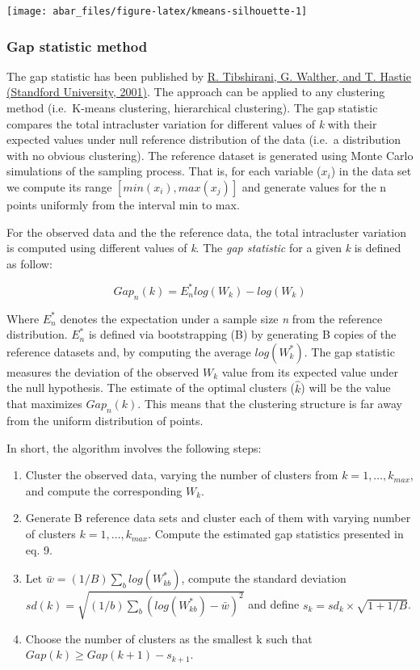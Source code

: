 \documentclass[]{book}
\providecommand{\tightlist}{%
  \setlength{\itemsep}{0pt}\setlength{\parskip}{0pt}}
\theoremstyle{definition}
\theoremstyle{definition}
\theoremstyle{definition}
\theoremstyle{remark}
\begin{document}
\begin{center}\texttt{[image: abar\_files/figure-latex/kmeans-silhouette-1]} \end{center}

\hypertarget{gap}{%
\subsubsection{Gap statistic method}\label{gap}}

The gap statistic has been published by
\href{http://web.stanford.edu/~hastie/Papers/gap.pdf}{R. Tibshirani, G.
Walther, and T. Hastie (Standford University, 2001)}. The approach can
be applied to any clustering method (i.e.~K-means clustering,
hierarchical clustering). The gap statistic compares the total
intracluster variation for different values of \emph{k} with their
expected values under null reference distribution of the data (i.e.~a
distribution with no obvious clustering). The reference dataset is
generated using Monte Carlo simulations of the sampling process. That
is, for each variable (\(x_i\)) in the data set we compute its range
\([min(x_i), max(x_j)]\) and generate values for the n points uniformly
from the interval min to max.

For the observed data and the the reference data, the total intracluster
variation is computed using different values of \emph{k}. The \emph{gap
statistic} for a given \emph{k} is defined as follow:

\[ Gap_n(k) = E^*_n{log(W_k)} - log(W_k) \tag{9}\]

Where \(E^*_n\) denotes the expectation under a sample size \emph{n}
from the reference distribution. \(E^*_n\) is defined via bootstrapping
(B) by generating B copies of the reference datasets and, by computing
the average \(log(W^*_k)\). The gap statistic measures the deviation of
the observed \(W_k\) value from its expected value under the null
hypothesis. The estimate of the optimal clusters (\(\hat k\)) will be
the value that maximizes \(Gap_n(k)\). This means that the clustering
structure is far away from the uniform distribution of points.

In short, the algorithm involves the following steps:

\begin{enumerate}
\def\labelenumi{\arabic{enumi}.}
\tightlist
\item
  Cluster the observed data, varying the number of clusters from
  \(k=1, \dots, k_{max}\), and compute the corresponding \(W_k\).
\item
  Generate B reference data sets and cluster each of them with varying
  number of clusters \(k=1, \dots, k_{max}\). Compute the estimated gap
  statistics presented in eq. 9.
\item
  Let \(\bar w = (1/B) \sum_b log(W^*_{kb})\), compute the standard
  deviation \(sd(k) = \sqrt{(1/b)\sum_b(log(W^*_{kb})- \bar w)^2}\) and
  define \(s_k = sd_k \times \sqrt{1 + 1/B}\).
\item
  Choose the number of clusters as the smallest k such that
  \(Gap(k) \geq Gap(k+1) - s_{k+1}\).
\end{enumerate}
\end{document}
